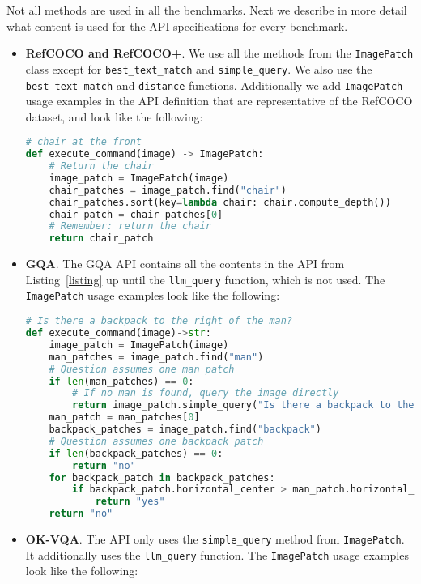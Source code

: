 \documentclass[10pt,twocolumn,letterpaper]{article}
\begin{document}
Not all methods are used in all the benchmarks. Next we describe in more detail what content is used for the API specifications for every benchmark.
\begin{itemize}
    \item \textbf{RefCOCO and RefCOCO+}. We use all the methods from the \texttt{ImagePatch} class except for \texttt{best\_text\_match} and \texttt{simple\_query}. We also use the \texttt{best\_text\_match} and \texttt{distance} functions. Additionally we add \texttt{ImagePatch} usage examples in the API definition that are representative of the RefCOCO dataset, and look like the following:
    \begin{lstlisting}[language=Python, caption=\textbf{RefCOCO example.}, xleftmargin=.0\textwidth, xrightmargin=.0\textwidth]
# chair at the front
def execute_command(image) -> ImagePatch:
    # Return the chair
    image_patch = ImagePatch(image)
    chair_patches = image_patch.find("chair")
    chair_patches.sort(key=lambda chair: chair.compute_depth())
    chair_patch = chair_patches[0]
    # Remember: return the chair
    return chair_patch
\end{lstlisting}
    \item \textbf{GQA}. The GQA API contains all the contents in the API from Listing~\ref{listing} up until the \texttt{llm\_query} function, which is not used. The \texttt{ImagePatch} usage examples look like the following:
\begin{lstlisting}[language=Python, caption=\textbf{GQA example.}, xleftmargin=.0\textwidth, xrightmargin=.0\textwidth]
# Is there a backpack to the right of the man?
def execute_command(image)->str:
    image_patch = ImagePatch(image)
    man_patches = image_patch.find("man")
    # Question assumes one man patch
    if len(man_patches) == 0:
        # If no man is found, query the image directly
        return image_patch.simple_query("Is there a backpack to the right of the man?")
    man_patch = man_patches[0]
    backpack_patches = image_patch.find("backpack")
    # Question assumes one backpack patch
    if len(backpack_patches) == 0:
        return "no"
    for backpack_patch in backpack_patches:
        if backpack_patch.horizontal_center > man_patch.horizontal_center:
            return "yes"
    return "no"
\end{lstlisting}
    \item \textbf{OK-VQA}. The API only uses the \texttt{simple\_query} method from \texttt{ImagePatch}. It additionally uses the \texttt{llm\_query} function. The \texttt{ImagePatch} usage examples look like the following:
\begin{lstlisting}[language=Python, caption=\textbf{OK-VQA example.}, xleftmargin=.0\textwidth, xrightmargin=.0\textwidth]


\end{lstlisting}
\end{itemize}
\end{document}
